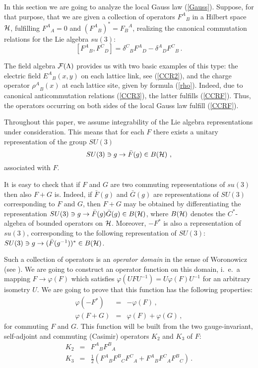 \documentclass[a4paper,12pt]{article}
\begin{document}
In this section we are going to analyze the local Gauss law
(\ref{Gauss}). Suppose, for that purpose, that we are given a
collection of operators ${F^A}_B$ in a Hilbert space $\cal H$,
fulfilling ${F^A}_A = 0$ and $({F^A}_B)^*  =  {F_B}^A$, realizing
the canonical commutation relations for the Lie algebra $su(3)$:
\begin{equation}
\label{CCRF} [{F^A}_B , {F^C}_D] = {\delta^C}_B {F^A}_D  -
{\delta^A}_D {F^C}_B  \, .
\end{equation}

The field algebra  ${\cal F}(\Lambda )$ provides us with two basic
examples of this type: the electric field ${E^A}_B(x,y)$ on each
lattice link, see (\ref{CCR2}), and the charge operator
${\rho^A}_B(x)$ at each lattice site, given by formula
(\ref{rho}). Indeed, due to canonical anticommutation relations
(\ref{CCR3}), the latter fulfills (\ref{CCRF}). Thus, the
operators occurring on both sides of the local Gauss law fulfill
(\ref{CCRF}).

Throughout this paper, we assume integrability of the Lie algebra
representations under consideration. This means that for each $F$
there exists a unitary representation of the group $SU(3)$
\begin{equation}
SU(3) \ni g \rightarrow {\bar F}(g) \in B({\cal H}) \ ,
\end{equation}
associated with $F$.

It is easy to check that if $F$ and $G$ are two commuting
representations of $su(3)$ then also $F+G$ is. Indeed, if ${\bar
F}(g)$ and ${\bar G}(g)$ are representations of $SU(3)$
corresponding to $F$ and $G$, then $F+G$ may be obtained by
differentiating the representation $SU(3) \ni g \rightarrow {\bar
F}(g) {\bar G}(g)\in B({\cal H}) $, where $B({\cal H}) $ denotes
the $C^*$-algebra of bounded operators on ${\cal H}$. Moreover,
$-F^*$ is also a representation of $su(3)$, corresponding to the
following representation of $SU(3)$: $SU(3) \ni g \rightarrow
({\bar F}(g^{-1}))^* \in B({\cal H}) $.

Such a collection of operators is an {\em operator domain} in the
sense of Woronowicz (see \cite{kot}). We are going to construct an
operator function on this domain, i.~e.~a mapping $F \rightarrow
\varphi(F)$ which satisfies $\varphi(U F U^{-1} ) = U \varphi(F)
U^{-1}$ for an arbitrary isometry $U$. We are going to prove that
this function has the following properties:
\begin{eqnarray}
\varphi(- F^*) & = & - \varphi(F) \, , \label{fi2}\\ \varphi(F +
G) & = & \varphi(F) + \varphi(G) \label{fi3}\, ,
\end{eqnarray}
for commuting $F$ and $G$. This function will be built from the
two gauge-invariant, self-adjoint and commuting (Casimir)
operators $K_2$ and $K_3$ of $F$:
\begin{eqnarray}
K_2  & = & {F^A}_B {F^B}_A \, \\ K_3  & = &  \frac 12 \left(
{F^A}_B {F^B}_C {F^C}_A + {F^A}_B {F^C}_A {F^B}_C \right) \, .
\end{eqnarray}
\end{document}
